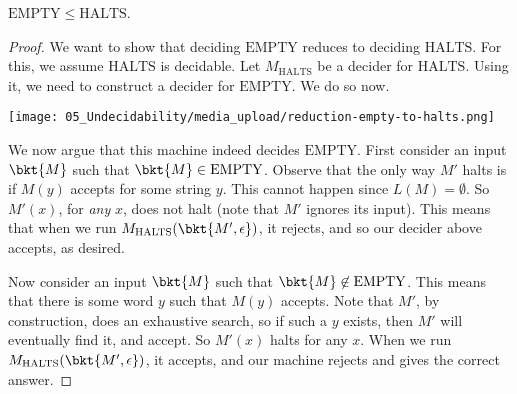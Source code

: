 \begin{flex}
\label{grp:theorem:mathrmEMPTY-leq-mathrmHALTS}

\begin{theorem}
\label{theorem:mathrmEMPTY-leq-mathrmHALTS}
$\mathrm{EMPTY} \leq \mathrm{HALTS}$.

\end{theorem}

\begin{proof}
\label{prf:Undecidable-Languages::deciding}
We want to show that deciding $\text{EMPTY}$ reduces to deciding $\text{HALTS}$. For this, we assume $\text{HALTS}$ is decidable. Let $M_\text{HALTS}$ be a decider for $\text{HALTS}$. Using it, we need to construct a decider for $\text{EMPTY}$. We do so now.

\begin{center}
\texttt{[image: 05\_Undecidability/media\_upload/reduction-empty-to-halts.png]}
\end{center}

We now argue that this machine indeed decides $\text{EMPTY}$. First consider an input $\bkt{M}$ such that $\bkt{M} \in \text{EMPTY}$. Observe that the only way $M'$ halts is if $M(y)$ accepts for some string $y$. This cannot happen since $L(M) = \emptyset$. So $M'(x)$, for \emph{any} $x$, does not halt (note that $M'$ ignores its input). This means that when we run $M_\text{HALTS}(\bkt{M', \epsilon})$, it rejects, and so our decider above accepts, as desired. 

Now consider an input $\bkt{M}$ such that $\bkt{M} \not \in \text{EMPTY}$. This means that there is some word $y$ such that $M(y)$ accepts. Note that $M'$, by construction, does an exhaustive search, so if such a $y$ exists, then $M'$ will eventually find it, and accept. So $M'(x)$ halts for any $x$. When we run $M_\text{HALTS}(\bkt{M', \epsilon})$, it accepts, and our machine rejects and gives the correct answer.

\end{proof}
\end{flex}

